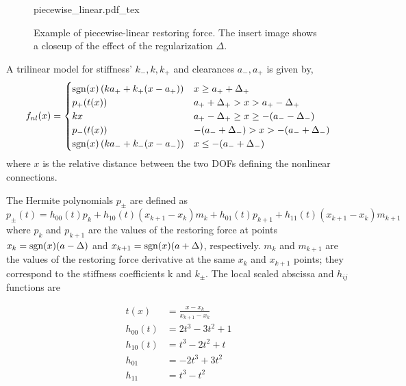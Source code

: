 \begin{figure}[!ht]
  \centering
  \def\svgwidth{10cm}
  {piecewise_linear.pdf_tex}
  \caption{Example of piecewise-linear restoring force. The insert image shows a
    closeup of the effect of the regularization $\Delta$.}
  \label{fig:fnl_piecewise}
\end{figure}


A trilinear model for stiffness' $k_-, k, k_+$ and clearances $a_-, a_+$ is
given by, %
\begin{equation}
  \label{eq:fnl_piecewise}
  f_{nl}(x) =
  \begin{cases}
    \operatorname{sgn}(x) \left( ka_+ + k_+(x-a_+) \right) & x \geq a_+ + \Delta_+ \\
    p_+(t(x)) & a_+ + \Delta_+ > x > a_+ - \Delta_+ \\
    kx & a_+ - \Delta_+ \geq x \geq  -(a_- - \Delta_-) \\
    p_-(t(x)) & -(a_- + \Delta_-) > x > -(a_- + \Delta_-) \\
    \operatorname{sgn}(x) \left( ka_- + k_-(x-a_-) \right) & x \leq -(a_- + \Delta_-) \\
  \end{cases}
\end{equation}
where $x$ is the relative distance between the two DOFs defining the nonlinear
connections.

The Hermite polynomials $p_\pm$ are defined as
\begin{equation}
  \label{eq:fnl_herm_pol}
  p_\pm(t) = h_{00}(t)p_k + h_{10}(t)(x_{k+1}-x_k)m_k + h_{01}(t)p_{k+1} + h_{11}(t)(x_{k+1} - x_k)m_{k+1}
\end{equation}
where $p_k$ and $p_{k+1}$ are the values of the restoring force at points $x_k =
\operatorname{sgn}(x)(a - \Delta)$ and $x_{k+1} = \operatorname{sgn}(x)(a + \Delta)$, respectively. $m_k$
and $m_{k+1}$ are the values of the restoring force derivative at the same $x_k$
and $x_{k+1}$ points; they correspond to the stiffness coefficients k and
$k_\pm$. The local scaled abscissa and $h_{ij}$ functions are

\begin{equation}
  \label{eq:fnl_piecewise_coeff}
  \begin{aligned}
    t(x) &= \frac{x - x_k}{x_{k+1} - x_k}\\
    h_{00}(t) &=  2t^3 - 3t^2 + 1 \\
    h_{10}(t) &= t^3 - 2t^2 + t \\
    h_{01} &= -2t^3 + 3t^2 \\
    h_{11} &= t^3 - t^2 \\
  \end{aligned}
\end{equation}


